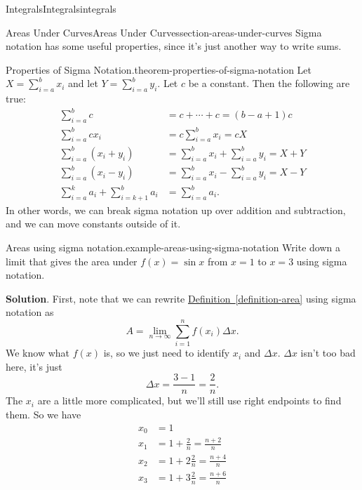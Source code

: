 \documentclass[oneside,10pt,]{book}
\numberwithin{equation}{section}
\begin{document}
\begin{chapterptx}{Integrals}{}{Integrals}{}{}{integrals}
\begin{sectionptx}{Areas Under Curves}{}{Areas Under Curves}{}{}{section-areas-under-curves}
\hypertarget{p-415}{}%
Sigma notation has some useful properties, since it's just another way to write sums.%
\begin{theorem}{Properties of Sigma Notation.}{}{theorem-properties-of-sigma-notation}%
\hypertarget{p-416}{}%
Let \(X = \sum_{i=a}^{b}x_{i}\) and let \(Y = \sum_{i=a}^{b}y_{i}\). Let \(c\) be a constant. Then the following are true:%
\begin{align*}
\sum_{i=a}^{b}c & = c+\cdots+c = (b-a+1)c \\
\sum_{i=a}^{b}cx_{i} & = c\sum_{i=a}^{b}x_{i} = cX \\
\sum_{i=a}^{b}(x_{i}+y_{i}) & = \sum_{i=a}^{b}x_{i} + \sum_{i=a}^{b}y_{i} = X + Y \\
\sum_{i=a}^{b}(x_{i} - y_{i}) & = \sum_{i=a}^{b}x_{i} - \sum_{i=a}^{b}y_{i} = X - Y \\
\sum_{i=a}^{k}a_{i} + \sum_{i=k+1}^{b}a_{i} & = \sum_{i=a}^{b}a_{i}. 
\end{align*}
In other words, we can break sigma notation up over addition and subtraction, and we can move constants outside of it.%
\end{theorem}
\begin{example}{Areas using sigma notation.}{example-areas-using-sigma-notation}%
\hypertarget{p-417}{}%
Write down a limit that gives the area under \(f(x) = \sin x\) from \(x=1\) to \(x = 3\) using sigma notation.%
\par\smallskip%
\noindent\textbf{Solution}.\hypertarget{solution-92}{}\quad%
\hypertarget{p-418}{}%
First, note that we can rewrite \hyperref[definition-area]{Definition~\ref{definition-area}} using sigma notation as%
\begin{equation*}
A = \lim_{n\to\infty}\sum_{i=1}^{n}f(x_{i})\Delta x.
\end{equation*}
We know what \(f(x)\) is, so we just need to identify \(x_{i}\) and \(\Delta x\). \(\Delta x\) isn't too bad here, it's just%
\begin{equation*}
\Delta x = \frac{3-1}{n} = \frac{2}{n}.
\end{equation*}
The \(x_{i}\) are a little more complicated, but we'll still use right endpoints to find them. So we have%
\begin{align*}
x_{0} & = 1 \\
x_{1} & = 1 + \frac{2}{n} = \frac{n+2}{n} \\
x_{2} & = 1 + 2\frac{2}{n} = \frac{n+4}{n} \\
x_{3} & = 1 + 3\frac{2}{n} = \frac{n+6}{n} \\

\end{align*}
\end{example}
\end{sectionptx}
\end{chapterptx}
\end{document}

